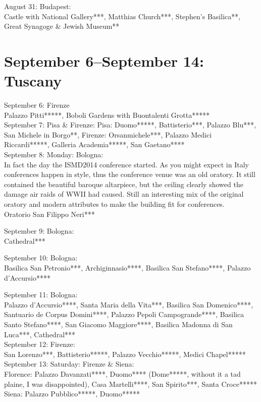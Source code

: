 August 31: Budapest:\\
Castle with National Gallery***, Matthias Church***, Stephen's Basilica**, Great Synagoge \& Jewish Museum**

\section{September 6--September 14: Tuscany}
\label{Tuscany2014}

September 6: Firenze\\
Palazzo Pitti*****, Boboli Gardens with Buontalenti Grotta*****\\

September 7: Pisa \& Firenze:
Pisa: Duomo*****, Battisterio***, Palazzo Blu***, San Michele in Borgo**, Firenze: Orsanmichele***, Palazzo Medici Riccardi*****, Galleria Academia*****, San Gaetano****\\

September 8: Monday: Bologna:\\
In fact the day the ISMD2014 conference started. As you might expect in Italy conferences happen in style, thus the conference venue was an old oratory. It still contained the beautiful baroque altarpiece, but the ceiling clearly showed the damage air raids of WWII had caused. Still an interesting mix of the original oratory and modern attributes to make the building fit for conferences.\\

Oratorio San Filippo Neri***

September 9: Bologna:\\
Cathedral***

September 10: Bologna:\\
Basilica San Petronio***, Archiginnasio****, Basilica San Stefano****, Palazzo d'Accursio****

September 11: Bologna:\\
Palazzo d'Accursio****, Santa Maria della Vita***, Basilica San Domenico****, Santuario de Corpus Domini****, Palazzo Pepoli Campogrande****, Basilica Santo Stefano****, San Giacomo Maggiore****, Basilica Madonna di San Luca***, Cathedral***\\

September 12: Firenze:\\
San Lorenzo***, Battisterio*****,  Palazzo Vecchio*****, Medici Chapel*****\\

September 13: Saturday: Firenze \& Siena:\\
Florence: Palazzo Davanzati****, Duomo**** (Dome*****, without it a tad plaine, I was disappointed), Casa Martelli****, San Spirito***, Santa Croce*****
Siena: Palazzo Pubblico*****, Duomo*****\\

